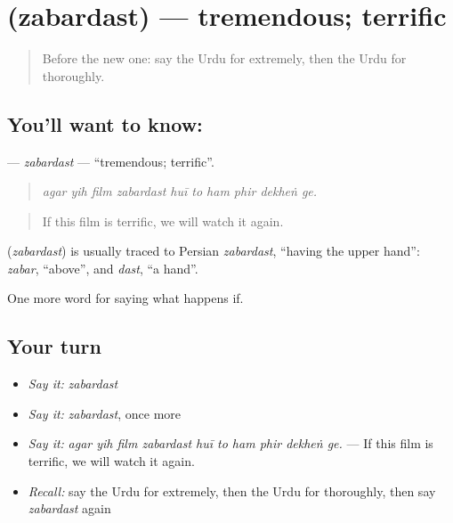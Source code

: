\section[\texorpdfstring{\ur{زبردست} (zabardast)}{زبردست (zabardast)}]{ (zabardast) — tremendous; terrific}

\label{lesson:UR-C375-zabardast}



\begin{quote}
Before the new one: say the Urdu for extremely, then the Urdu for thoroughly.
\end{quote}

\subsection*{You'll want to know: }
\textbf{} — \emph{zabardast} — \textquotedblleft{}tremendous; terrific\textquotedblright{}.

\begin{quote}
         
\end{quote}

\begin{quote}
\emph{agar yih film zabardast huī to ham phir dekheṅ ge.}
\end{quote}

\begin{quote}
If this film is terrific, we will watch it again.
\end{quote}

\begin{cousinweb}
\textbf{} (\emph{zabardast}) is usually traced to Persian \emph{zabardast}, \textquotedblleft{}having the upper hand\textquotedblright{}: \emph{zabar}, \textquotedblleft{}above\textquotedblright{}, and \emph{dast}, \textquotedblleft{}a hand\textquotedblright{}.
\end{cousinweb}

\begin{grammarlens}[title={What you've built}]
One more word for saying what happens if.
\end{grammarlens}

\subsection*{Your turn}
\begin{itemize}
\raggedright
  \item \emph{Say it:} \emph{zabardast}
  \item \emph{Say it:} \emph{zabardast}, once more
  \item \emph{Say it:} \emph{agar yih film zabardast huī to ham phir dekheṅ ge.} — If this film is terrific, we will watch it again.
  \item \emph{Recall:} say the Urdu for extremely, then the Urdu for thoroughly, then say \emph{zabardast} again
\end{itemize}


